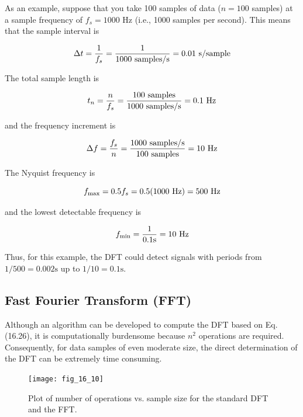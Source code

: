 \documentclass[../main.tex]{subfiles}
\begin{document}
As an example, suppose that you take 100 samples of data ($n = 100$ samples) at a
sample frequency of $f_s = 1000$ Hz (i.e., 1000 samples per second). This means that the
sample interval is

\begin{equation}
	\notag
	\Delta t = \frac{1}{f_s}=\frac{1}{1000 \text{ samples/s}} = 0.01 \text{ s/sample}
\end{equation}

\noindent The total sample length is 

\begin{equation}
	\notag
	t_n = \frac{n}{f_s} = \frac{100 \text{ samples}}{1000 \text{ samples/s}}=0.1 \text{ Hz}
\end{equation}

\noindent and the frequency increment is

\begin{equation}
	\notag
	\Delta f = \frac{f_s}{n} = \frac{1000 \text{ samples/s}}{100 \text{ samples}}=10 \text{ Hz}
\end{equation}

\noindent The Nyquist frequency is

\begin{equation}
	\notag
	f_{\text{max}} = 0.5 f_s = 0.5 (1000 \text{ Hz}) = 500 \text{ Hz}
\end{equation}

\noindent and the lowest detectable frequency is

\begin{equation}
	\notag
	f_{\text{min}} = \frac{1}{0.1 \text{s}} = 10 \text{ Hz}
\end{equation}

\noindent Thus, for this example, the DFT could detect signals with periods from $1/500 = 0.002 \text{s}$ up
to $1/10 = 0.1\text{s}$.

\label{cha:cha_P_16_5_1} %
\subsection{Fast Fourier Transform (FFT)}

\noindent Although an algorithm can be developed to compute the DFT based on Eq. (16.26), it is
computationally burdensome because $n^2$ operations are required. Consequently, for data
samples of even moderate size, the direct determination of the DFT can be extremely time
consuming.

\begin{figure}[H] 
	\centering
	\texttt{[image: fig\_16\_10]}
	\caption{\textsf{Plot of number of operations vs. sample size for the standard DFT and the FFT.}}
	\label{fig:fig_16_10}
\end{figure}
\end{document}

